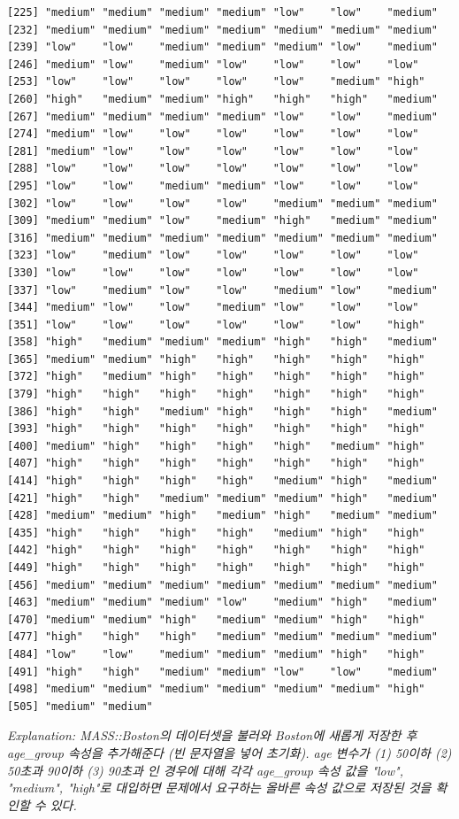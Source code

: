 \documentclass{article}
\begin{document}
\begin{lstlisting}[style={out-style}]
[225] "medium" "medium" "medium" "medium" "low"    "low"    "medium"
[232] "medium" "medium" "medium" "medium" "medium" "medium" "medium"
[239] "low"    "low"    "medium" "medium" "medium" "low"    "medium"
[246] "medium" "low"    "medium" "low"    "low"    "low"    "low"   
[253] "low"    "low"    "low"    "low"    "low"    "medium" "high"  
[260] "high"   "medium" "medium" "high"   "high"   "high"   "medium"
[267] "medium" "medium" "medium" "medium" "low"    "low"    "medium"
[274] "medium" "low"    "low"    "low"    "low"    "low"    "low"   
[281] "medium" "low"    "low"    "low"    "low"    "low"    "low"   
[288] "low"    "low"    "low"    "low"    "low"    "low"    "low"   
[295] "low"    "low"    "medium" "medium" "low"    "low"    "low"   
[302] "low"    "low"    "low"    "low"    "medium" "medium" "medium"
[309] "medium" "medium" "low"    "medium" "high"   "medium" "medium"
[316] "medium" "medium" "medium" "medium" "medium" "medium" "medium"
[323] "low"    "medium" "low"    "low"    "low"    "low"    "low"   
[330] "low"    "low"    "low"    "low"    "low"    "low"    "low"   
[337] "low"    "medium" "low"    "low"    "medium" "low"    "medium"
[344] "medium" "low"    "low"    "medium" "low"    "low"    "low"   
[351] "low"    "low"    "low"    "low"    "low"    "low"    "high"  
[358] "high"   "medium" "medium" "medium" "high"   "high"   "medium"
[365] "medium" "medium" "high"   "high"   "high"   "high"   "high"  
[372] "high"   "medium" "high"   "high"   "high"   "high"   "high"  
[379] "high"   "high"   "high"   "high"   "high"   "high"   "high"  
[386] "high"   "high"   "medium" "high"   "high"   "high"   "medium"
[393] "high"   "high"   "high"   "high"   "high"   "high"   "high"  
[400] "medium" "high"   "high"   "high"   "high"   "medium" "high"  
[407] "high"   "high"   "high"   "high"   "high"   "high"   "high"  
[414] "high"   "high"   "high"   "high"   "medium" "high"   "medium"
[421] "high"   "high"   "medium" "medium" "medium" "high"   "medium"
[428] "medium" "medium" "high"   "medium" "high"   "medium" "medium"
[435] "high"   "high"   "high"   "high"   "medium" "high"   "high"  
[442] "high"   "high"   "high"   "high"   "high"   "high"   "high"  
[449] "high"   "high"   "high"   "high"   "high"   "high"   "high"  
[456] "medium" "medium" "medium" "medium" "medium" "medium" "medium"
[463] "medium" "medium" "medium" "low"    "medium" "high"   "medium"
[470] "medium" "medium" "high"   "medium" "medium" "high"   "high"  
[477] "high"   "high"   "high"   "medium" "medium" "medium" "medium"
[484] "low"    "low"    "medium" "medium" "medium" "high"   "high"  
[491] "high"   "high"   "medium" "medium" "low"    "low"    "medium"
[498] "medium" "medium" "medium" "medium" "medium" "medium" "high"  
[505] "medium" "medium"
\end{lstlisting}
\emph{Explanation: MASS::Boston의 데이터셋을 불러와 Boston에 새롭게 저장한 후 age\_group 속성을 추가해준다 (빈 문자열을 넣어 초기화). age 변수가 (1) 50이하 (2) 50초과 90이하 (3) 90초과 인 경우에 대해 각각 age\_group 속성 값을 "low", "medium", "high"로 대입하면 문제에서 요구하는 올바른 속성 값으로 저장된 것을 확인할 수 있다. } \\
\end{document}
